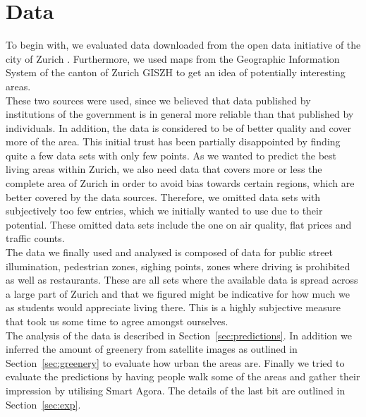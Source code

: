 \documentclass[letterpaper]{article}
\begin{document}
\section{Data}\label{sec:data}
To begin with, we evaluated data downloaded from the open data initiative of the city of Zurich \cite{ZurichOD}. Furthermore, we used maps from the Geographic Information System of the canton of Zurich GISZH \cite{GISZH} to get an idea of potentially interesting areas.\\
\indent These two sources were used, since we believed that data published by institutions of the government is in general more reliable than that published by individuals. In addition, the data is considered to be of better quality and cover more of the area. This initial trust has been partially disappointed by finding quite a few data sets with only few points. As we wanted to predict the best living areas within Zurich, we also need data that covers more or less the complete area of Zurich in order to avoid bias towards certain regions, which are better covered by the data sources. Therefore, we omitted data sets with subjectively too few entries, which we initially wanted to use due to their potential. These omitted data sets include the one on air quality, flat prices and traffic counts.\\
\indent The data we finally used and analysed is composed of data for public street illumination, pedestrian zones, sighing points, zones where driving is prohibited as well as restaurants. These are all sets where the available data is spread across a large part of Zurich and that we figured might be indicative for how much we as students would appreciate living there. This is a highly subjective measure that took us some time to agree amongst ourselves.\\
\indent The analysis of the data is described in Section~\ref{sec:predictions}. In addition we inferred the amount of greenery from satellite images as outlined in Section~\ref{sec:greenery} to evaluate how urban the areas are. Finally we tried to evaluate the predictions by having people walk some of the areas and gather their impression by utilising Smart Agora. The details of the last bit are outlined in Section~\ref{sec:exp}.
\end{document}
